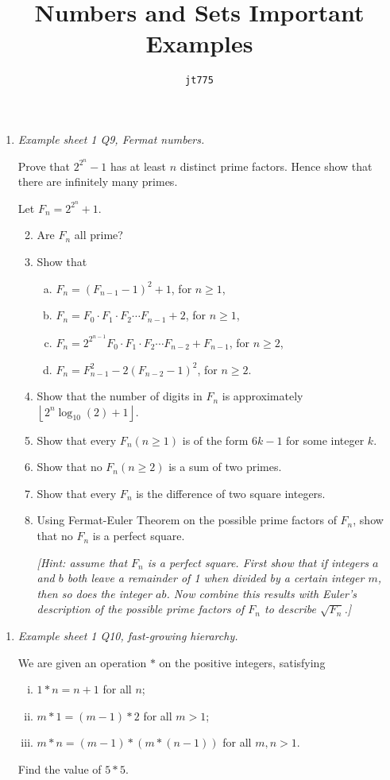 \documentclass[11pt]{article}
\title{\textbf{Numbers and Sets Important Examples}}
\author{\texttt{jt775}}
\date{\null}
\newlength{\qspace}
\newcounter{qnumber}
\newenvironment{question}%
 {\vspace{\qspace}
  \begin{enumerate}[\bfseries 1\quad][10]%
    \setcounter{enumi}{\value{qnumber}}%
    \item%
 }
{
  \end{enumerate}
  \filbreak
  \stepcounter{qnumber}
 }
\newenvironment{questionparts}[1][1]%
 {
  \begin{enumerate}[\bfseries (i)]%
    \setcounter{enumii}{#1}
    \addtocounter{enumii}{-1}
    \setlength{\parskip}{3pt}
 }
 {
  \end{enumerate}
 }
\def\ge{\geqslant}
\def\geq{\geqslant}
\begin{document}
\maketitle
\vspace{-1.5cm}
\begin{question}\textit{Example sheet 1 Q9, Fermat numbers.}
  
  Prove that $2^{2^{n}}-1$ has at least $n$ distinct prime factors. Hence show that there are infinitely many primes.

  Let $ F_n=2^{2^{n}}+1 $. 
  \begin{questionparts}
    \item Are $F_n$ all prime?
    \item Show that 
    \begin{enumerate}[(a)]
      \item $F_{n}=\left(F_{n-1}-1\right)^{2}+1$, for $n \geq 1$,
      \item $F_{n}=F_{0} \cdot F_{1} \cdot F_{2} \cdots F_{n-1}+2$, for $n \geq 1$,
      \item $F_{n}=2^{2^{n-1}} F_{0} \cdot F_{1} \cdot F_{2} \cdots F_{n-2}+F_{n-1}$, for $n \geq 2$,
      \item $F_{n}=F_{n-1}^{2}-2\left(F_{n-2}-1\right)^{2}$, for $n \geq 2$.
    \end{enumerate}
    \item Show that the number of digits in $F_{n}$ is approximately $\left\lfloor 2^{n} \log _{10}(2)+1\right\rfloor$.
    \item Show that every $F_{n}(n \ge 1)$ is of the form $6 k-1$ for some integer $k$.
    \item Show that no $F_{n}(n \geq 2)$ is a sum of two primes.
    \item Show that every $F_{n}$ is the difference of two square integers.
    \item Using Fermat-Euler Theorem on the possible prime factors of $F_{n}$, show that no $F_{n}$ is a perfect square. 
    
    \textit{[Hint: assume that $F_{n}$ is a perfect square. First show that if integers $a$ and $b$ both leave a remainder of 1 when divided by a certain integer $m$, then so does the integer $a b$. Now combine this results with Euler's description of the possible prime factors of $F_{n}$ to describe $\sqrt{F_{n}}$.]}
  \end{questionparts}
\end{question}

\begin{question}\textit{Example sheet 1 Q10, fast-growing hierarchy.}
  
  We are given an operation $*$ on the positive integers, satisfying
  \begin{enumerate}[(i)]
    \item $1 * n=n+1$ for all $n$;
    \item $m * 1=(m-1) * 2$ for all $m>1$;
    \item $m * n=(m-1) *(m *(n-1))$ for all $m, n>1$. 
  \end{enumerate}
  Find the value of $5 * 5$.
\end{question}
\end{document}
